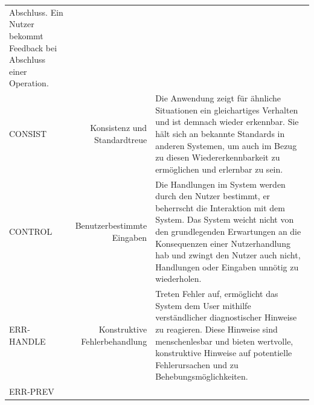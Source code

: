 \documentclass[
  12pt,
  ngerman,
  a4paper,
]{article}
\begin{document}
\begin{longtable}[]{@{}lrl@{}}
\begin{minipage}[t]{0.58\columnwidth}
Abschluss. Ein Nutzer bekommt Feedback bei Abschluss einer
Operation.\strut
\end{minipage}\tabularnewline
\begin{minipage}[t]{0.09\columnwidth}\raggedright
CONSIST\strut
\end{minipage} & \begin{minipage}[t]{0.25\columnwidth}\raggedleft
Konsistenz und Standardtreue\strut
\end{minipage} & \begin{minipage}[t]{0.58\columnwidth}\raggedright
Die Anwendung zeigt für ähnliche Situationen ein gleichartiges Verhalten
und ist demnach wieder erkennbar. Sie hält sich an bekannte Standards in
anderen Systemen, um auch im Bezug zu diesen Wiedererkennbarkeit zu
ermöglichen und erlernbar zu sein.\strut
\end{minipage}\tabularnewline
\begin{minipage}[t]{0.09\columnwidth}\raggedright
CONTROL\strut
\end{minipage} & \begin{minipage}[t]{0.25\columnwidth}\raggedleft
Benutzerbestimmte Eingaben\strut
\end{minipage} & \begin{minipage}[t]{0.58\columnwidth}\raggedright
Die Handlungen im System werden durch den Nutzer bestimmt, er beherrscht
die Interaktion mit dem System. Das System weicht nicht von den
grundlegenden Erwartungen an die Konsequenzen einer Nutzerhandlung hab
und zwingt den Nutzer auch nicht, Handlungen oder Eingaben unnötig zu
wiederholen.\strut
\end{minipage}\tabularnewline
\begin{minipage}[t]{0.09\columnwidth}\raggedright
ERR-HANDLE\strut
\end{minipage} & \begin{minipage}[t]{0.25\columnwidth}\raggedleft
Konstruktive Fehlerbehandlung\strut
\end{minipage} & \begin{minipage}[t]{0.58\columnwidth}\raggedright
Treten Fehler auf, ermöglicht das System dem User mithilfe
verständlicher diagnostischer Hinweise zu reagieren. Diese Hinweise sind
menschenlesbar und bieten wertvolle, konstruktive Hinweise auf
potentielle Fehlerursachen und zu Behebungsmöglichkeiten.\strut
\end{minipage}\tabularnewline
\begin{minipage}[t]{0.09\columnwidth}\raggedright
ERR-PREV\strut
\end{minipage} & \begin{minipage}[t]{0.25\columnwidth}\raggedleft

\end{minipage}
\end{longtable}
\end{document}
